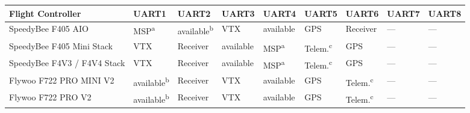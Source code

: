 \begin{paracol}{2}[]
\colende

\begin{table}[htb!]
\centering
\setlength{\tabcolsep}{4pt}       %
\renewcommand{\arraystretch}{1.5} %
\begin{threeparttable}
\scriptsize
\label{TabelleUARTuebersicht}
\begin{tabularx}{\textwidth}{lYYYYYYYY}
\toprule
Flight Controller              & UART1 &  UART2 & UART3 & UART4 & UART5 & UART6 & UART7 & UART8  \\
\midrule
SpeedyBee F405 AIO             & MSP\textsuperscript{a}  & available\textsuperscript{b} & VTX       & available & GPS  & Receiver & --- & --- \\
SpeedyBee F405 Mini Stack      & VTX   & Receiver        & available & MSP\textsuperscript{a} & Telem.\textsuperscript{c} & GPS & --- & ---     \\
SpeedyBee F4V3 / F4V4 Stack           & VTX   & Receiver        & available & MSP\textsuperscript{a} & Telem.\textsuperscript{c} & GPS & --- & ---     \\
Flywoo F722 PRO MINI V2        & available\textsuperscript{b} & Receiver & VTX & available & GPS & Telem.\textsuperscript{c} & --- & --- \\
Flywoo F722 PRO V2              & available\textsuperscript{b} & Receiver & VTX & available & GPS & Telem.\textsuperscript{c} & --- & --- \\
 

\end{tabularx}
\end{threeparttable}
\end{table}
\end{paracol}
